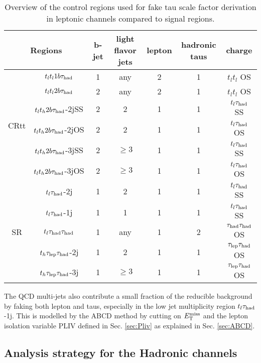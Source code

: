 \begin{table}
\centering
\caption{Overview of the control regions used for fake tau scale factor derivation in leptonic channels compared to signal regions.}
\label{tab:sfcr}
\begin{tabular}[h]{c|c|c|c|c|c|c}
\hline \hline
\multicolumn{2}{c|}{Regions} & b-jet & light flavor jets	& lepton & hadronic taus & charge\\ \hline
\multirow{6}{*}{CRtt}&$t_lt_l1b\tau_\text{had}$	& 1     & any				& 2      & 1			 & $t_lt_l$ OS\\ \cline{2-7}
&$t_lt_l2b\tau_\text{had}$	& 2     & any				& 2      & 1			 & $t_lt_l$ OS\\ \cline{2-7}
&$t_lt_h2b\tau_\text{had}$-2jSS	& 2     & 2 				& 1      & 1             & $t_l\tau_\text{had}$ SS\\ \cline{2-7}
&$t_lt_h2b\tau_\text{had}$-2jOS	& 2     & 2      			& 1      & 1             & $t_l\tau_\text{had}$ OS\\ \cline{2-7}
&$t_lt_h2b\tau_\text{had}$-3jSS	& 2     & $\ge3$ 			& 1      & 1             & $t_l\tau_\text{had}$ SS\\ \cline{2-7}
&$t_lt_h2b\tau_\text{had}$-3jOS	& 2     & $\ge3$      		& 1      & 1             & $t_l\tau_\text{had}$ OS\\ \hline
\multirow{5}{*}{SR}&$t_l\tau_\text{had}$-2j  & 1     & 2					& 1      & 1			 & $t_l\tau_\text{had}$ SS\\ \cline{2-7}
&$t_l\tau_\text{had}$-1j  & 1     & 1					& 1      & 1			 & $t_l\tau_\text{had}$ SS\\ \cline{2-7}
&$t_l\tau_\text{had}{}\tau_\text{had}$	   & 1     & any				& 1      & 2             & $\tau_\text{had}{}\tau_\text{had}$ OS\\ \cline{2-7}
&$t_h\tau_\text{lep}{}\tau_\text{had}$-2j   & 1     & 2      			& 1      & 1             & $\tau_\text{lep}{}\tau_\text{had}$ OS\\ \cline{2-7}
&$t_h\tau_\text{lep}{}\tau_\text{had}$-3j   & 1     & $\ge3$ 			& 1      & 1             & $\tau_\text{lep}{}\tau_\text{had}$ OS\\ \hline
\end{tabular}
\end{table}

The QCD multi-jets also contribute a small fraction of the reducible background by faking both lepton and taus, especially in the low jet multiplicity region $t_l\tau_\text{had}$-1j. This is modelled by the ABCD method by cutting on $E_{\text{T}}^{\text{miss}}$ and the lepton isolation variable PLIV defined in Sec. \ref{sec:Pliv} as explained in Sec. \ref{sec:ABCD}.

\subsection{Analysis strategy for the Hadronic channels}


